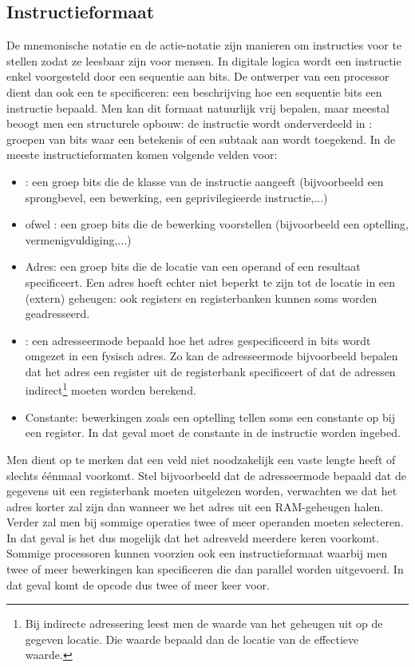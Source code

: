 \subsection{Instructieformaat}
De mnemonische notatie en de actie-notatie zijn manieren om instructies voor te stellen zodat ze leesbaar zijn voor mensen. In digitale logica wordt een instructie enkel voorgesteld door een sequentie aan bits. De ontwerper van een processor dient dan ook een  te specificeren: een beschrijving hoe een sequentie bits een instructie bepaald. Men kan dit formaat natuurlijk vrij bepalen, maar meestal beoogt men een structurele opbouw: de instructie wordt onderverdeeld in : groepen van bits waar een betekenis of een subtaak aan wordt toegekend. In de meeste instructieformaten komen volgende velden voor:
\begin{itemize}
 \item {}: een groep bits die de klasse van de instructie aangeeft (bijvoorbeeld een sprongbevel, een bewerking, een geprivilegieerde instructie,...)
 \item {} ofwel : een groep bits die de bewerking voorstellen (bijvoorbeeld een optelling, vermenigvuldiging,...)
 \item Adres: een groep bits die de locatie van een operand of een resultaat specificeert. Een adres hoeft echter niet beperkt te zijn tot de locatie in een (extern) geheugen: ook registers en registerbanken kunnen soms worden geadresseerd.
 \item {}: een adresseermode bepaald hoe het adres gespecificeerd in bits wordt omgezet in een fysisch adres. Zo kan de adresseermode bijvoorbeeld bepalen dat het adres een register uit de registerbank specificeert of dat de adressen indirect\footnote{Bij indirecte adressering leest men de waarde van het geheugen uit op de gegeven locatie. Die waarde bepaald dan de locatie van de effectieve waarde.} moeten worden berekend.
 \item Constante: bewerkingen zoals een optelling tellen soms een constante op bij een register. In dat geval moet de constante in de instructie worden ingebed.
\end{itemize}
Men dient op te merken dat een veld niet noodzakelijk een vaste lengte heeft of slechts \'e\'enmaal voorkomt. Stel bijvoorbeeld dat de adresseermode bepaald dat de gegevens uit een registerbank moeten uitgelezen worden, verwachten we dat het adres korter zal zijn dan wanneer we het adres uit een RAM-geheugen halen. Verder zal men bij sommige operaties twee of meer operanden moeten selecteren. In dat geval is het dus mogelijk dat het adresveld meerdere keren voorkomt. Sommige processoren kunnen voorzien ook een instructieformaat waarbij men twee of meer bewerkingen kan specificeren die dan parallel worden uitgevoerd. In dat geval komt de opcode dus twee of meer keer voor.
